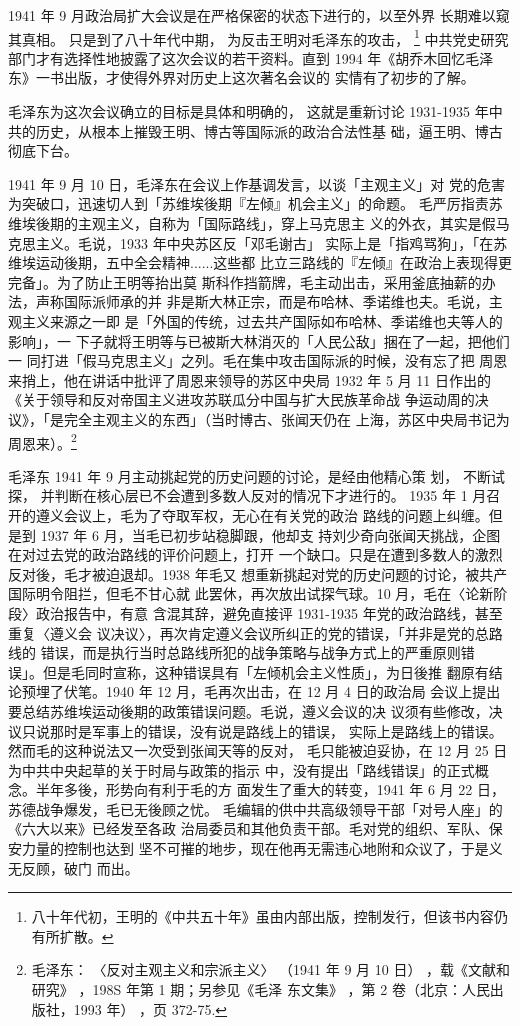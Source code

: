 1941 年 9 月政治局扩大会议是在严格保密的状态下进行的，以至外界
长期难以窥其真相。
只是到了八十年代中期，
为反击王明对毛泽东的攻击，
\footnote{八十年代初，王明的《中共五十年》虽由内部出版，控制发行，但该书内容仍有所扩散。
}
中共党史研究部门才有选择性地披露了这次会议的若干资料。直到 1994
年《胡乔木回忆毛泽东》一书出版，才使得外界对历史上这次著名会议的
实情有了初步的了解。

毛泽东为这次会议确立的目标是具体和明确的，
这就是重新讨论 1931-1935 年中共的历史，从根本上摧毁王明、博古等国际派的政治合法性基
础，逼王明、博古彻底下台。

1941 年 9 月 10 日，毛泽东在会议上作基调发言，以谈「主观主义」对
党的危害为突破口，迅速切人到「苏维埃後期『左倾』机会主义」的命题。
毛严厉指责苏维埃後期的主观主义，自称为「国际路线」，穿上马克思主
义的外衣，其实是假马克思主义。毛说，1933 年中央苏区反「邓毛谢古」
实际上是「指鸡骂狗」，「在苏维埃运动後期，五中全会精神......这些都
比立三路线的『左倾』在政治上表现得更完备」。为了防止王明等抬出莫
斯科作挡箭牌，毛主动出击，采用釜底抽薪的办法，声称国际派师承的并
非是斯大林正宗，而是布哈林、季诺维也夫。毛说，主观主义来源之一即
是「外国的传统，过去共产国际如布哈林、季诺维也夫等人的影响」，一
下子就将王明等与已被斯大林消灭的「人民公敌」捆在了一起，把他们一
同打进「假马克思主义」之列。毛在集中攻击国际派的时候，没有忘了把
周恩来捎上，他在讲话中批评了周恩来领导的苏区中央局 1932 年 5 月 11
日作出的《关于领导和反对帝国主义进攻苏联瓜分中国与扩大民族革命战
争运动周的决议》，「是完全主观主义的东西」（当时博古、张闻天仍在
上海，苏区中央局书记为周恩来）。\footnote{毛泽东：
〈反对主观主义和宗派主义〉
（1941 年 9 月 10 日）
，载《文献和研究》
，198S 年第 1 期；另参见《毛泽
东文集》
，第 2 卷（北京：人民出版社，1993 年）
，页 372-75.}

毛泽东 1941 年 9 月主动挑起党的历史问题的讨论，是经由他精心策
划，
不断试探，
并判断在核心层已不会遭到多数人反对的情况下才进行的。
 1935 年 1 月召开的遵义会议上，毛为了夺取军权，无心在有关党的政治
路线的问题上纠缠。但是到 1937 年 6 月，当毛已初步站稳脚跟，他却支
持刘少奇向张闻天挑战，企图在对过去党的政治路线的评价问题上，打开
一个缺口。只是在遭到多数人的激烈反对後，毛才被迫退却。1938 年毛又
想重新挑起对党的历史问题的讨论，被共产国际明令阻拦，但毛不甘心就
此罢休，再次放出试探气球。10 月，毛在〈论新阶段〉政治报告中，有意
含混其辞，避免直接评 1931-1935 年党的政治路线，甚至重复〈遵义会
议决议〉，再次肯定遵义会议所纠正的党的错误，「并非是党的总路线的
错误，而是执行当时总路线所犯的战争策略与战争方式上的严重原则错
误」。但是毛同时宣称，这种错误具有「左倾机会主义性质」，为日後推
翻原有结论预埋了伏笔。1940 年 12 月，毛再次出击，在 12 月 4 日的政治局
会议上提出要总结苏维埃运动後期的政策错误问题。毛说，遵义会议的决
议须有些修改，决议只说那时是军事上的错误，没有说是路线上的错误，
实际上是路线上的错误。然而毛的这种说法又一次受到张闻天等的反对，
毛只能被迫妥协，在 12 月 25 日为中共中央起草的关于时局与政策的指示
中，没有提出「路线错误」的正式概念。半年多後，形势向有利于毛的方
面发生了重大的转变，1941 年 6 月 22 日，苏德战争爆发，毛已无後顾之忧。
毛编辑的供中共高级领导干部「对号人座」的《六大以来》已经发至各政
治局委员和其他负责干部。毛对党的组织、军队、保安力量的控制也达到
坚不可摧的地步，现在他再无需违心地附和众议了，于是义无反顾，破门
而出。

